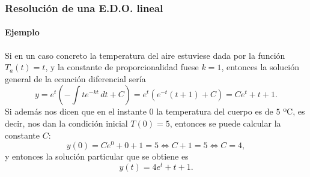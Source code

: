 \begin{frame}
\frametitle{Resolución de una E.D.O. lineal}
\framesubtitle{Ejemplo}
Si en un caso concreto la temperatura del aire estuviese dada por la función $T_a(t)=t$, y la constante de proporcionalidad fuese $k=1$, entonces la solución general de la ecuación diferencial sería
\[
y=e^{t}\left(-\int te^{-kt}\,dt+C\right)=e^t(e^{-t}(t+1)+C)=Ce^t+t+1.
\]
Si además nos dicen que en el instante $0$ la temperatura del cuerpo es de $5$ ºC, es decir, nos dan la condición inicial $T(0)=5$, entonces
se puede calcular la constante $C$:
\[
y(0)=Ce^0+0+1=5 \Leftrightarrow C+1=5 \Leftrightarrow C=4,
\]
y entonces la solución particular que se obtiene es
\[
y(t)=4e^t+t+1.
\]
\end{frame}
